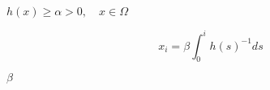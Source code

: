 \documentclass{article}
\begin{document}
$ h(x)\ge \alpha>0, \quad x\in\Omega $
\pagebreak

\[ x_i=\beta\int_0^i h(s)^{-1}ds \]
\pagebreak

$\beta$
\pagebreak
\end{document}
